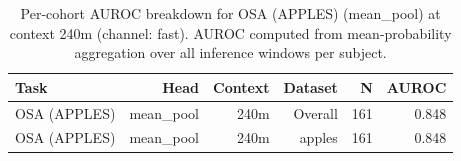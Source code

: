 \begin{table}[ht]
\centering
\caption{Per-cohort AUROC breakdown for OSA (APPLES) (mean_pool) at context 240m (channel: fast). AUROC computed from mean-probability aggregation over all inference windows per subject.}
\label{tab:cohort_osa_binary_apples_postqc_mean_pool_fast}
\begin{tabular}{lrrrrr}
\toprule
Task & Head & Context & Dataset & N & AUROC \\
\midrule
OSA (APPLES) & mean_pool & 240m & Overall & 161 & 0.848 \\
OSA (APPLES) & mean_pool & 240m & apples & 161 & 0.848 \\
\bottomrule
\end{tabular}
\end{table}